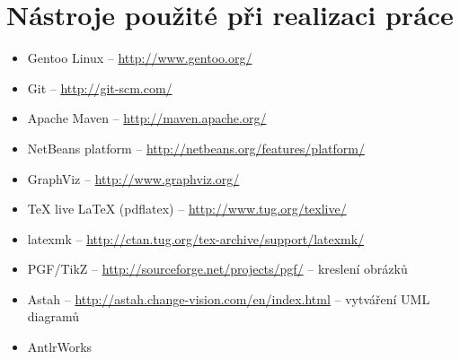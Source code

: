 \chapter{Nástroje použité při realizaci práce}
\noindent

\noindent

\begin{itemize}
\item Gentoo Linux -- \href{http://www.gentoo.org/}{http://www.gentoo.org/}
\item Git -- \href{http://git-scm.com/}{http://git-scm.com/}
\item Apache Maven -- \href{http://maven.apache.org/}{http://maven.apache.org/}
\item NetBeans platform -- \href{http://netbeans.org/features/platform/}{http://netbeans.org/features/platform/}
\item GraphViz -- \href{http://www.graphviz.org/}{http://www.graphviz.org/}
\item TeX live \LaTeX{} (pdflatex) -- \href{http://www.tug.org/texlive/}{http://www.tug.org/texlive/}
\item latexmk -- \href{http://ctan.tug.org/tex-archive/support/latexmk/}{http://ctan.tug.org/tex-archive/support/latexmk/}
\item PGF/TikZ -- \href{http://sourceforge.net/projects/pgf/}{http://sourceforge.net/projects/pgf/} -- kreslení obrázků
\item Astah -- \href{http://astah.change-vision.com/en/index.html}{http://astah.change-vision.com/en/index.html} -- vytváření UML diagramů
\item AntlrWorks
\end{itemize}
